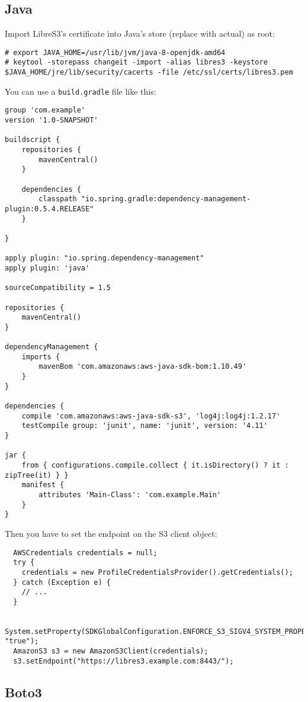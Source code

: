 \subsection{Java}

Import LibreS3's certificate into Java's store (replace with actual) as root:
\begin{lstlisting}
# export JAVA_HOME=/usr/lib/jvm/java-8-openjdk-amd64
# keytool -storepass changeit -import -alias libres3 -keystore $JAVA_HOME/jre/lib/security/cacerts -file /etc/ssl/certs/libres3.pem
\end{lstlisting}

You can use a \verb|build.gradle| file like this:
\begin{lstlisting}
group 'com.example'
version '1.0-SNAPSHOT'

buildscript {
    repositories {
        mavenCentral()
    }

    dependencies {
        classpath "io.spring.gradle:dependency-management-plugin:0.5.4.RELEASE"
    }

}

apply plugin: "io.spring.dependency-management"
apply plugin: 'java'

sourceCompatibility = 1.5

repositories {
    mavenCentral()
}

dependencyManagement {
    imports {
        mavenBom 'com.amazonaws:aws-java-sdk-bom:1.10.49'
    }
}

dependencies {
    compile 'com.amazonaws:aws-java-sdk-s3', 'log4j:log4j:1.2.17'
    testCompile group: 'junit', name: 'junit', version: '4.11'
}

jar {
    from { configurations.compile.collect { it.isDirectory() ? it : zipTree(it) } }
    manifest {
        attributes 'Main-Class': 'com.example.Main'
    }
}
\end{lstlisting}

Then you have to set the endpoint on the S3 client object:
\begin{lstlisting}
  AWSCredentials credentials = null;
  try {
    credentials = new ProfileCredentialsProvider().getCredentials();
  } catch (Exception e) {
    // ...
  }

  System.setProperty(SDKGlobalConfiguration.ENFORCE_S3_SIGV4_SYSTEM_PROPERTY, "true");
  AmazonS3 s3 = new AmazonS3Client(credentials);
  s3.setEndpoint("https://libres3.example.com:8443/");
\end{lstlisting}

\subsection{Boto3}

